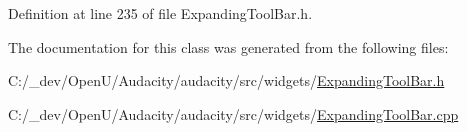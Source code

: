 Definition at line 235 of file Expanding\+Tool\+Bar.\+h.



The documentation for this class was generated from the following files\+:\begin{DoxyCompactItemize}
\item 
C\+:/\+\_\+dev/\+Open\+U/\+Audacity/audacity/src/widgets/\hyperlink{_expanding_tool_bar_8h}{Expanding\+Tool\+Bar.\+h}\item 
C\+:/\+\_\+dev/\+Open\+U/\+Audacity/audacity/src/widgets/\hyperlink{_expanding_tool_bar_8cpp}{Expanding\+Tool\+Bar.\+cpp}\end{DoxyCompactItemize}
